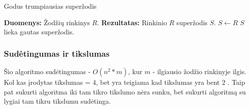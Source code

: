 \documentclass{VUMIFInfKursinis}
\begin{document}
\begin{algorithm}[H]
  \caption{Godus trumpiausias superžodis}
  \DontPrintSemicolon
  \textbf{Duomenys:} Žodžių rinkinys $R$. \;
  \textbf{Rezultatas:} Rinkinio $R$ superžodis $S$. \;
  $S \gets R$ \;
  $S$ lieka gautas superžodis.
\end{algorithm}
\subsubsection{Sudėtingumas ir tikslumas}
Šio algoritmo sudėtingumas - $O(n^2 * m)$, kur $m$ - ilgiausio žodžio rinkinyje ilgis.
Kol kas įrodytas tikslumas = 4, bet yra teigiama kad tikslumas yra bent 2 \cite{TARHIO1988131}. Taip pat sukurti algoritma iki tam tikro tikslumo nėra sunku, bet sukurti algoritmą su lygiai tam tikru tikslumu sudėtinga. \cite{ssparticle}

\printbibliography[heading=bibintoc] %

\end{document}
